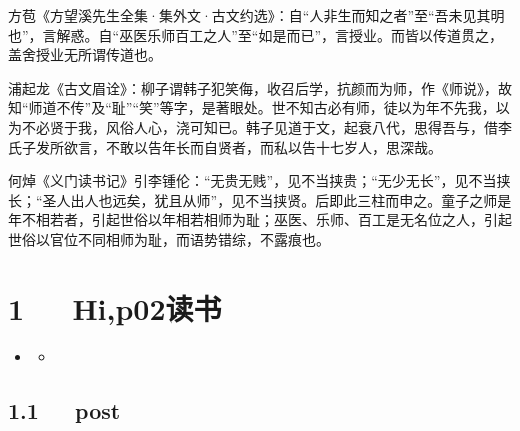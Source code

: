 \documentclass[letterpaper,12pt,english]{sphinxmanual}
\begin{document}
方苞《方望溪先生全集·集外文·古文约选》：自“人非生而知之者”至“吾未见其明也”，言解惑。自“巫医乐师百工之人”至“如是而已”，言授业。而皆以传道贯之，盖舍授业无所谓传道也。

浦起龙《古文眉诠》：柳子谓韩子犯笑侮，收召后学，抗颜而为师，作《师说》，故知“师道不传”及“耻”“笑”等字，是著眼处。世不知古必有师，徒以为年不先我，以为不必贤于我，风俗人心，浇可知已。韩子见道于文，起衰八代，思得吾与，借李氏子发所欲言，不敢以告年长而自贤者，而私以告十七岁人，思深哉。

何焯《义门读书记》引李锺伦：“无贵无贱”，见不当挟贵；“无少无长”，见不当挟长；“圣人出人也远矣，犹且从师”，见不当挟贤。后即此三柱而申之。童子之师是年不相若者，引起世俗以年相若相师为耻；巫医、乐师、百工是无名位之人，引起世俗以官位不同相师为耻，而语势错综，不露痕也。


\chapter{1   Hi,p02读书}
\label{\detokenize{p02_u8bfb_u4e66/Hello_uff0cp02_u8bfb_u4e66:hi-p02}}\label{\detokenize{p02_u8bfb_u4e66/Hello_uff0cp02_u8bfb_u4e66::doc}}
\begin{sphinxShadowBox}
\begin{itemize}
\item {} 
\label{\detokenize{p02_u8bfb_u4e66/Hello_uff0cp02_u8bfb_u4e66:id2}}{\hyperref[\detokenize{p02_u8bfb_u4e66/Hello_uff0cp02_u8bfb_u4e66:hi-p02}]{}}
\begin{itemize}
\item {} 
\label{\detokenize{p02_u8bfb_u4e66/Hello_uff0cp02_u8bfb_u4e66:id3}}{\hyperref[\detokenize{p02_u8bfb_u4e66/Hello_uff0cp02_u8bfb_u4e66:post}]{}}

\end{itemize}

\end{itemize}
\end{sphinxShadowBox}


\section{1.1   post}
\label{\detokenize{p02_u8bfb_u4e66/Hello_uff0cp02_u8bfb_u4e66:post}}
\end{document}
